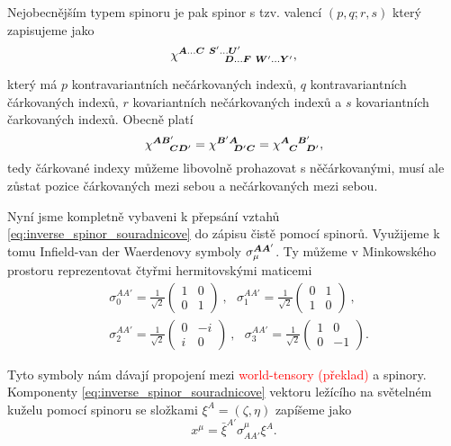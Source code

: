 Nejobecnějším typem spinoru je pak spinor s tzv. valencí $(p, q; r, s)$ který zapisujeme jako
\begin{equation}
    \chi^{{\boldsymbol{A}}\dots {\boldsymbol{C}} ~\boldsymbol{S}'\dots \boldsymbol{U}'}_{~~~~~~~~~~~{\boldsymbol{D}}\dots \boldsymbol{F}~ \boldsymbol{W}'\dots \boldsymbol{Y}'},
\end{equation}

který má $p$ kontravariantních nečárkovaných indexů, $q$ kontravariantních čárkovaných indexů, $r$
kovariantních nečárkovaných indexů a $s$ kovariantních čarkovaných indexů. Obecně platí
\begin{equation}
    \chi^{{\boldsymbol{A}}{\boldsymbol{B}}'}_{~~~~{\boldsymbol{C}}{\boldsymbol{D}}'} = \chi^{{\boldsymbol{B}}'{\boldsymbol{A}}}_{~~~~{\boldsymbol{D}}'{\boldsymbol{C}}} = \chi^{{\boldsymbol{A}}~~{\boldsymbol{B}}'}_{~~{\boldsymbol{C}}~~{\boldsymbol{D}}'},
\end{equation}
tedy čárkované indexy můžeme libovolně prohazovat s něčárkovanými, musí ale zůstat pozice čárkovaných mezi sebou
a nečárkovaných mezi sebou.

Nyní jsme kompletně vybaveni k přepsání vztahů \eqref{eq:inverse_spinor_souradnicove} do zápisu čistě pomocí spinorů.
Využijeme k tomu Infield-van der Waerdenovy symboly $\sigma_\mu^{{\boldsymbol{A}}{\boldsymbol{A}}'}$. Ty můžeme v Minkowského prostoru reprezentovat
čtyřmi hermitovskými maticemi
\begin{equation}
    \begin{split}
        &\sigma_0^{AA'}=\frac{1}{\sqrt{2}}\left(\begin{matrix}
            1 & 0 \\
            0 & 1
        \end{matrix}\right)~,~~~ \sigma_1^{AA'}=\frac{1}{\sqrt{2}}\left(\begin{matrix}
            0 & 1 \\
            1 & 0
        \end{matrix}\right)~,\\
        &\sigma_2^{AA'}=\frac{1}{\sqrt{2}}\left(\begin{matrix}
            0 & -i \\
            i & 0
        \end{matrix}\right)~,~~~ \sigma_3^{AA'}=\frac{1}{\sqrt{2}}\left(\begin{matrix}
            1 & 0 \\
            0 & -1
        \end{matrix}\right).
    \end{split}
\end{equation}

Tyto symboly nám dávají propojení mezi \textcolor{red}{world-tensory (překlad)} a spinory. Komponenty
\eqref{eq:inverse_spinor_souradnicove} vektoru ležícího na světelném kuželu pomocí spinoru se
složkami $\xi^A=(\zeta, \eta)$ zapíšeme jako
\begin{equation}
    x^\mu = \bar{\xi}^{A'} \sigma_{AA'}^\mu \xi^A.
\end{equation}

